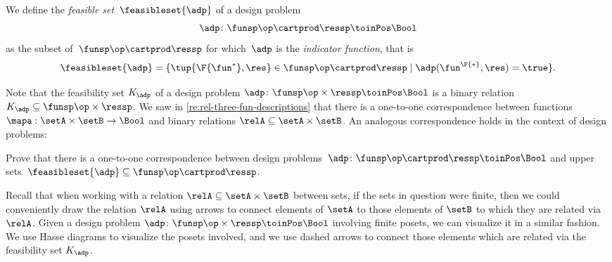 \begin{definition}
    \label{def:dp-feasible-set}
    We define the \emph{feasible set}~$\feasibleset{\adp}$ of a design problem~
    \begin{equation}
        \label{eq:generic-design-prob}
        \adp\colon \funsp\op \cartprod \ressp \toinPos \Bool
    \end{equation}
    as the subset of~$\funsp \op\cartprod \ressp$ for which~$\adp$ is the \emph{indicator function}, that is%
    \begin{equation}
        \label{eq:design-prob-as-upper-set}
        \feasibleset{\adp} = \{ \tup{\F{\fun^*},\res} \in \funsp \op\cartprod \ressp  \mid %
        \adp(\fun^\F{*}, \res) = \true %
        \}.
    \end{equation}
\end{definition}

Note that the feasibility set $K_\adp$ of a design problem $\adp \colon \funsp \op \times \ressp\toinPos \Bool$ is a binary relation $K_\adp \subseteq \funsp\op \times \ressp$.
We saw in \cref{re:rel-three-fun-descriptions} that there is a one-to-one correspondence between functions $\mapa : \setA \times \setB \to \Bool$ and binary relations $\relA \subseteq \setA \times \setB$.
An analogous correspondence holds in the context of design problems:

\begin{exercise}
    \label{ex:adp-uppersets}
    Prove that there is a one-to-one correspondence between design problems~$\adp \colon \funsp \op \cartprod \ressp\toinPos \Bool$ and upper sets~$\feasibleset{\adp} \subseteq \funsp\op \cartprod \ressp$.
\end{exercise}
\begin{solution}
\end{solution}

Recall that when working with a relation $\relA \subseteq \setA \times \setB$ between sets, if the sets in question were finite, then we could conveniently draw the relation $\relA$ using arrows to connect elements of $\setA$ to those elements of $\setB$ to which they are related via $\relA$.
Given a design problem $\adp \colon \funsp \op \times \ressp\toinPos \Bool$ involving finite posets, we can visualize it in a similar fashion.
We use Hasse diagrams to visualize the posets involved, and we use dashed arrows to connect those elements which are related via the feasibility set $K_\adp$.


